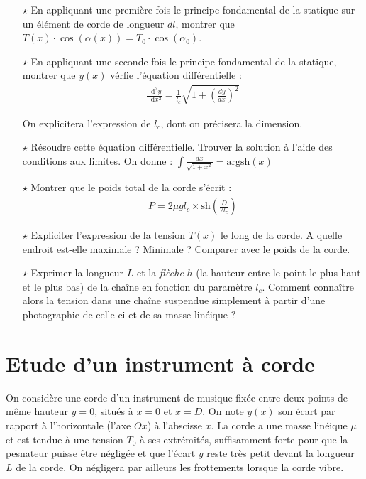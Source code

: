 \documentclass{report}
\newcommand*\dif{\mathop{}\!\mathrm{d}}
\begin{document}
\begin{itemize}

	\item[$\star$] En appliquant une première fois le principe fondamental de la statique sur un élément de corde de longueur $dl$, montrer que $T(x)\cdot\cos(\alpha(x))=T_0\cdot\cos(\alpha_0)$.

	\item[$\star$] En appliquant une seconde fois le principe fondamental de la statique, montrer que $y(x)$ vérfie l'équation différentielle :
	\begin{align*}
		\frac{\dif^2 y}{\dif x^2} =\frac{1}{l_c}\sqrt{1+\left( \frac{dy}{dx}\right)^2}
	\end{align*}	
	
	On explicitera l'expression de $l_c$, dont on précisera la dimension.
	
	\item[$\star$] Résoudre cette équation différentielle. Trouver la solution à l'aide des conditions aux limites. On donne : $\int \frac{dx}{\sqrt{1+x^2}}=\mathrm{argsh}(x)$
	
	\item[$\star$] Montrer que le poids total de la corde s'écrit :
\begin{align*}
		P = 2 \mu g l_c\times\mathrm{sh}\left(\frac{D}{2l_c} \right) 
\end{align*}
	
	\item[$\star$] Expliciter l'expression de la tension $T(x)$ le long de la corde. A quelle endroit est-elle maximale ? Minimale ? Comparer avec le poids de la corde. 
	
	\item[$\star$] Exprimer la longueur $L$ et la \textit{flèche} $h$ (la hauteur entre le point le plus haut et le plus bas) de la chaîne en fonction du paramètre $l_c$. Comment connaître alors la tension dans une chaîne suspendue simplement à partir d'une photographie de celle-ci et de sa masse linéique ?
	
\end{itemize}

\newpage

\section*{Etude d'un instrument à corde}

On considère une corde d'un instrument de musique fixée entre deux points de même hauteur $y=0$, situés à $x=0$ et $x=D$. On note $y(x)$ son écart par rapport à l'horizontale (l'axe $Ox$) à l'abscisse $x$. La corde a une masse linéique $\mu$ et est tendue à une tension $T_0$ à ses extrémités, suffisamment forte pour que la pesnateur puisse être négligée et que l'écart $y$ reste très petit devant la longueur $L$ de la corde. On négligera par ailleurs les frottements lorsque la corde vibre.
\end{document}
